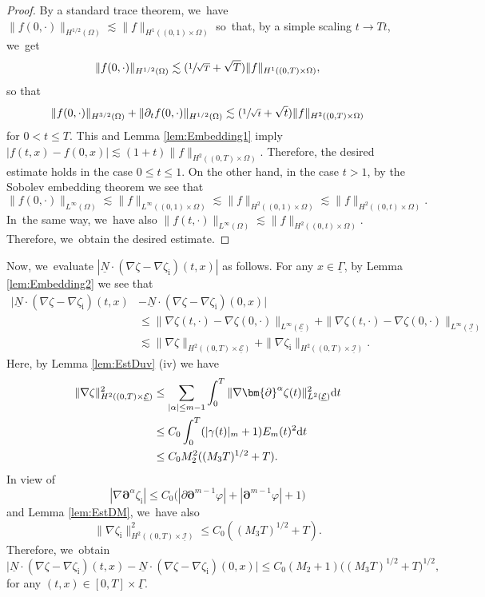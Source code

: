 \documentclass[10pt]{amsart}
\newcommand{\dt}{\partial_t}
\newcommand{\cI}{{\mathcal I}}
\newcommand{\cE}{{\mathcal E}}
\newcommand{\ul}[1]{\underline{#1}}
\newcommand{\itGamma}{\mathit{\Gamma}}
\theoremstyle{definition}
\begin{document}
\begin{proof}
By a standard trace theorem, we~have $\|f(0,\cdot)\|_{H^{1/2}(\Omega)} \lesssim \|f\|_{H^1((0,1)\times\Omega)}$ so~that, by a simple scaling $t\to Tt$, we~get
\[
\|f(0,\cdot)\|_{H^{1/2}(\Omega)} \lesssim (\sfrac{1}{\sqrt{T}}+\sqrt{T})\|f\|_{H^1((0,T)\times\Omega)},
\]
so that
\[
\|f(0,\cdot)\|_{H^{3/2}(\Omega)} + \|\dt f(0,\cdot)\|_{H^{1/2}(\Omega)} \lesssim (\sfrac{1}{\sqrt{t}}+\sqrt{t})\|f\|_{H^2((0,T)\times\Omega)}
\]
for $0<t\leq T$.
This and Lemma \ref{lem:Embedding1} imply $|f(t,x)-f(0,x)|\lesssim (1+t) \|f\|_{H^2((0,T)\times\Omega)}$.
Therefore, the desired estimate holds in the case $0\leq t\leq1$.
On the other hand, in the case $t>1$, by the Sobolev embedding theorem we see that
\[
\|f(0,\cdot)\|_{L^\infty(\Omega)} \lesssim \|f\|_{L^\infty((0,1)\times\Omega)} \lesssim \|f\|_{H^2((0,1)\times\Omega)} \lesssim \|f\|_{H^2((0,t)\times\Omega)}.
\]
In~the same way, we~have also $\|f(t,\cdot)\|_{L^\infty(\Omega)}\lesssim \|f\|_{H^2((0,t)\times\Omega)}$.
Therefore, we~obtain the desired estimate.
\end{proof}

Now, we~evaluate $|\ul{N}\cdot(\nabla\zeta-\nabla\zeta_\mathrm{i})(t,x)|$ as follows.
For any $x\in\ul{\itGamma}$, by Lemma \ref{lem:Embedding2} we see that
\begin{align*}
\bigl|\ul{N}\cdot(\nabla\zeta-\nabla\zeta_\mathrm{i})(t,x)&-\ul{N}\cdot(\nabla\zeta-\nabla\zeta_\mathrm{i})(0,x)\bigr| \\
&\leq \|\nabla\zeta(t,\cdot)-\nabla\zeta(0,\cdot)\|_{L^\infty(\ul{\cE})} + \|\nabla\zeta(t,\cdot)-\nabla\zeta(0,\cdot)\|_{L^\infty(\ul{\cI})} \\
&\lesssim \|\nabla\zeta\|_{H^2((0,T)\times\ul{\cE})} + \|\nabla\zeta_\mathrm{i}\|_{H^2((0,T)\times\ul{\cI})}.
\end{align*}
Here, by Lemma \ref{lem:EstDuv} (iv) we have
\begin{align*}
\|\nabla\zeta\|_{H^2((0,T)\times\ul{\cE})}^2
&\leq \sum_{|\alpha|\leq m-1}\int_0^T\|\nabla\bm{\partial}^\alpha\zeta(t)\|_{L^2(\ul{\cE})}^2 {\rm d}t \\
&\leq C_0\int_0^T(|\gamma(t)|_m+1)E_m(t)^2 {\rm d}t \\
&\leq C_0M_2^2((M_3T)^{1/2}+T).
\end{align*}
In view of
\[
|\nabla\bm{\partial}^\alpha\zeta_\mathrm{i}| \leq C_0\bigl(|\partial\bm{\partial}^{m-1}\varphi|+|\bm{\partial}^{m-1}\varphi|+1\bigr)
\]
and Lemma \ref{lem:EstDM}, we~have also
\[
\|\nabla\zeta_\mathrm{i}\|_{H^2((0,T)\times\ul{\cI})}^2 \leq C_0((M_3T)^{1/2}+T).
\]
Therefore, we~obtain
\begin{equation}\label{TransCond2}
\bigl|\ul{N}\cdot(\nabla\zeta-\nabla\zeta_\mathrm{i})(t,x)-\ul{N}\cdot(\nabla\zeta-\nabla\zeta_\mathrm{i})(0,x)\bigr|
\leq C_0(M_2+1)\bigl((M_3T)^{1/2}+T\bigr)^{1/2},
\end{equation}
for any $(t,x)\in[0,T]\times\ul{\itGamma}$.
\end{document}
